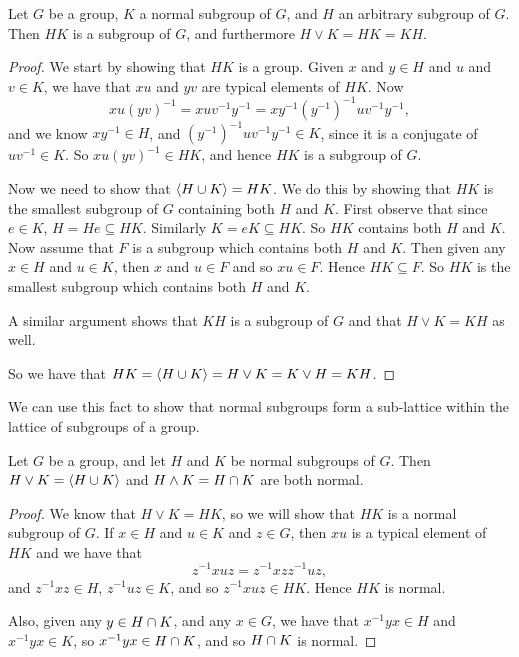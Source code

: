 \begin{proposition}\label{prop:normalproduct}
  Let $G$ be a group, $K$ a normal subgroup of $G$, and $H$ an
  arbitrary subgroup of $G$.  Then $HK$ is a subgroup of $G$, and
  furthermore $H \vee K = HK = KH$.
\end{proposition}
\begin{proof}
  We start by showing that $HK$ is a group.  Given $x$ and $y \in H$ and $u$
  and $v \in K$, we have that $xu$ and $yv$ are typical elements of $HK$.
  Now
  \[
    xu(yv)^{-1} = xuv^{-1}y^{-1} = xy^{-1}(y^{-1})^{-1}uv^{-1}y^{-1},
  \]
  and we know $xy^{-1} \in H$, and $(y^{-1})^{-1}uv^{-1}y^{-1} \in K$, since
  it is a conjugate of $uv^{-1} \in K$.  So $xu(yv)^{-1} \in HK$, and hence
  $HK$ is a subgroup of $G$.
  
  Now we need to show that $\langle H \cup K \rangle = HK$.  We do this by
  showing that $HK$ is the smallest subgroup of $G$ containing both $H$ and
  $K$.  First observe that since $e \in K$, $H = He \subseteq HK$. 
  Similarly $K = eK \subseteq HK$.  So $HK$ contains both $H$ and $K$.  Now
  assume that $F$ is a subgroup which contains both $H$ and $K$.  Then given
  any $x \in H$ and $u \in K$, then $x$ and $u \in F$ and so $xu \in F$. 
  Hence $HK \subseteq F$.  So $HK$ is the smallest subgroup which contains
  both $H$ and $K$.
  
  A similar argument shows that $KH$ is a subgroup of $G$ and that 
  $H \vee K = KH$ as well.
  
  So we have that $HK = \langle H \cup K \rangle = H \vee K = K \vee H =
  KH$.
\end{proof}

We can use this fact to show that normal subgroups form a sub-lattice 
within the lattice of subgroups of a group.

\begin{theorem}
  Let $G$ be a group, and let $H$ and $K$ be normal subgroups of $G$.  Then
  $H \vee K = \langle H \cup K \rangle$ and $H \wedge K = H \cap K$
  are both normal.
\end{theorem}
\begin{proof}
  We know that $H \vee K = HK$, so we will show that $HK$ is a normal
  subgroup of $G$.  If $x \in H$ and $u \in K$ and $z \in G$, then
  $xu$ is a typical element of $HK$ and we have that
  \[
    z^{-1}xuz = z^{-1}xzz^{-1}uz,
  \]
  and $z^{-1}xz \in H$, $z^{-1}uz \in K$, and so $z^{-1}xuz \in HK$.  Hence
  $HK$ is normal.

  Also, given any $y \in H \cap K$, and any $x \in G$, we have
  that $x^{-1}yx \in H$ and $x^{-1}yx \in K$, so $x^{-1}yx \in H
  \cap K$, and so $H \cap K$ is normal.
\end{proof}

